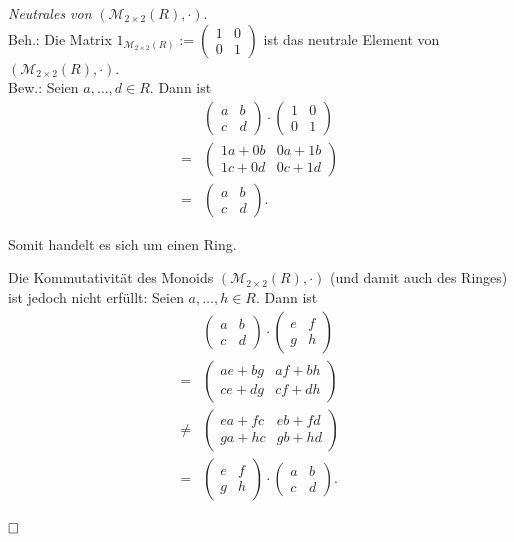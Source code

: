 \documentclass[12pt,a4paper]{article}
\newcommand{\qed}{\null\nobreak\hfill\square}
\begin{document}
\begin{enumerate}[(a)]
    \textit{Neutrales von} $(\mathcal{M}_{2\times2}(R), \cdot)$.\\
    Beh.: Die Matrix $1_{\mathcal{M}_{2\times2}(R)} := \begin{pmatrix}
    1&0\\0&1
    \end{pmatrix}$ ist das neutrale Element von $(\mathcal{M}_{2\times2}(R), \cdot)$.\\
    Bew.: Seien $a,\dots,d \in R$.
    Dann ist
    \begin{align*}
        &\begin{pmatrix}
        a&b\\c&d
        \end{pmatrix} \cdot \begin{pmatrix}
        1&0\\0&1
        \end{pmatrix}\\
        = &\begin{pmatrix}
        1a+0b&0a+1b\\
        1c+0d&0c+1d
        \end{pmatrix}\\
        = &\begin{pmatrix}
        a&b\\c&d
        \end{pmatrix}.
    \end{align*}

    Somit handelt es sich um einen Ring.

    Die Kommutativität des Monoids $(\mathcal{M}_{2\times2}(R), \cdot)$ (und damit auch des Ringes) ist jedoch nicht erfüllt:
    Seien $a,\dots,h \in R$.
    Dann ist
    \begin{align*}
        &\begin{pmatrix}
        a&b\\c&d
        \end{pmatrix} \cdot \begin{pmatrix}
        e&f\\g&h
        \end{pmatrix}\\
        = &\begin{pmatrix}
        ae + bg & af + bh\\
        ce + dg & cf + dh
        \end{pmatrix}\\
        \neq &\begin{pmatrix}
        ea + fc & eb + fd\\
        ga + hc & gb + hd
        \end{pmatrix}\\
        = &\begin{pmatrix}
        e&f\\g&h
        \end{pmatrix} \cdot \begin{pmatrix}
        a&b\\c&d
        \end{pmatrix}.
    \end{align*}\\
    $\qed$\pagebreak


\end{enumerate}
\end{document}
